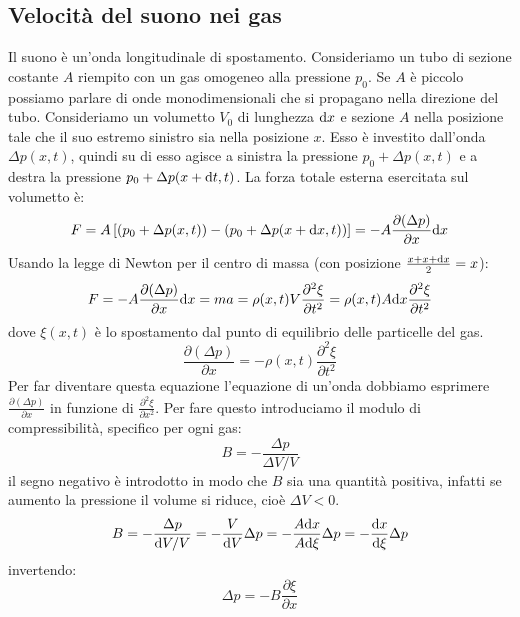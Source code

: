 \subsection{Velocità del suono nei gas}
Il suono è un'onda longitudinale di spostamento. Consideriamo un tubo di sezione costante $A$ riempito con un gas omogeneo alla pressione $p_0$. Se $A$ è piccolo possiamo parlare di onde monodimensionali che si propagano nella direzione del tubo. Consideriamo un volumetto $V_0$ di lunghezza $\mathrm{d} x$ e sezione $A$ nella posizione tale che il suo estremo sinistro sia nella posizione $x$. Esso è investito dall'onda $\Delta p(x,t)$, quindi su di esso agisce a sinistra la pressione $p_0+\Delta p(x,t)$ e a destra la pressione $p_0+\Delta p(x+\mathrm{d} t,t)$. La forza totale esterna esercitata sul volumetto è:
\begin{equation}
	F=A\left[(p_0+\Delta p(x,t))-(p_0+\Delta p(x+\mathrm{d} x,t))\right]=-A\frac{\partial(\Delta p)}{\partial x}\mathrm{d} x
\end{equation}
Usando la legge di Newton per il centro di massa (con posizione $\frac{x+x+\mathrm{d} x}{2}=x$):
\begin{equation}
	F=-A \frac{\partial(\Delta p)}{\partial x}\mathrm{d} x=ma=\rho(x,t)V\frac{\partial^2\xi}{\partial t^2}=\rho(x,t)A\mathrm{d} x\frac{\partial^2\xi}{\partial t^2}
\end{equation}
dove $\xi(x,t)$ è lo spostamento dal punto di equilibrio delle particelle del gas.
\begin{equation}
	\frac{\partial(\Delta p)}{\partial x}=-\rho(x,t)\frac{\partial^2\xi}{\partial t^2}
\end{equation}
Per far diventare questa equazione l'equazione di un'onda dobbiamo esprimere $\frac{\partial(\Delta p)}{\partial x}$ in funzione di $\frac{\partial^2\xi}{\partial x^2}$. Per fare questo introduciamo il modulo di compressibilità, specifico per ogni gas:
\begin{equation}
	B=-\frac{\Delta p}{\Delta V/V}
\end{equation}
il segno negativo è introdotto in modo che $B$ sia una quantità positiva, infatti se aumento la pressione il volume si riduce, cioè $\Delta V<0$.
\begin{equation}
	B=-\frac{\Delta p}{\mathrm{d} V/V}=-\frac{V}{\mathrm{d} V}\Delta p=-\frac{A\mathrm{d} x}{A\mathrm{d}\xi}\Delta p=-\frac{\mathrm{d} x}{\mathrm{d}\xi}\Delta p
\end{equation}
invertendo:
\begin{equation}
	\Delta p=-B\frac{\partial\xi}{\partial x}
	\label{eq:pxi}
\end{equation}
